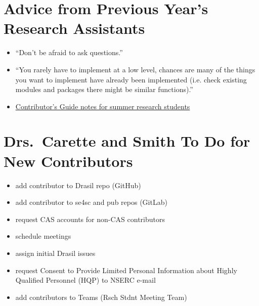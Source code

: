 \documentclass[12pt]{article}
\begin{document}
\section{Advice from Previous Year's Research Assistants} \label{SecAdvice}

\begin{itemize}

\item ``Don't be afraid to ask questions.''

\item ``You rarely have to implement at a low level, chances are many of the
things you want to implement have already been implemented (i.e. check existing
modules and packages there might be similar functions).''

\item
\href{https://github.com/JacquesCarette/Drasil/wiki/Contributor's-Guide#note-to-future-summer-research-students}
{Contributor's Guide notes for summer research students}

\end{itemize}

\section{Drs.\ Carette and Smith To Do for New Contributors} \label{SecToDo}

\begin{itemize}
\item add contributor to Drasil repo (GitHub)
\item add contributor to se4sc and pub repos (GitLab)
\item request CAS accounts for non-CAS contributors
\item schedule meetings
\item assign initial Drasil issues
\item request Consent to Provide Limited Personal Information about Highly
Qualified Personnel (HQP) to NSERC e-mail
\item add contributors to Teams (Rsch Stdnt Meeting Team)
\end{itemize}
\end{document}

